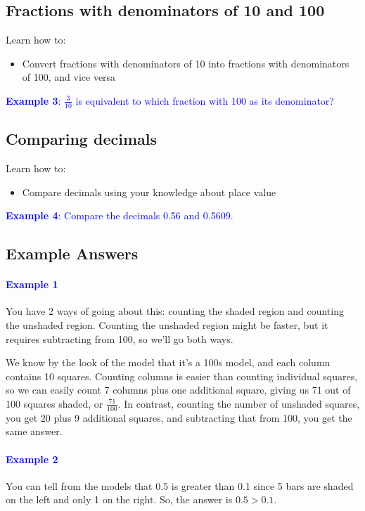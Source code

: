 \documentclass[a4paper, 12pt]{article}
\begin{document}
\subsection*{Fractions with denominators of 10 and 100}

Learn how to:

\begin{itemize}
    \item Convert fractions with denominators of 10 into fractions with denominators of 100, and vice versa
\end{itemize}

\textcolor{blue}{\textbf{Example 3}: $\frac{3}{10}$ is equivalent to which fraction with 100 as its denominator?}

\subsection*{Comparing decimals}
Learn how to:

\begin{itemize}
    \item Compare decimals using your knowledge about place value
\end{itemize}

\textcolor{blue}{\textbf{Example 4}: Compare the decimals 0.56 and 0.5609.}

\newpage

\subsection*{Example Answers}

\paragraph{\textcolor{blue}{Example 1}} You have 2 ways of going about this: counting the shaded region and counting the unshaded region. Counting the unshaded region might be faster, but it requires subtracting from 100, so we'll go both ways.

We know by the look of the model that it's a 100s model, and each column contains 10 squares. Counting columns is easier than counting individual squares, so we can easily count 7 columns plus one additional square, giving us 71 out of 100 squares shaded, or $\boxed{\frac{71}{100}}$. In contrast, counting the number of unshaded squares, you get 20 plus 9 additional squares, and subtracting that from 100, you get the same answer.

\paragraph{\textcolor{blue}{Example 2}} You can tell from the models that 0.5 is greater than 0.1 since 5 bars are shaded on the left and only 1 on the right. So, the answer is $\boxed{0.5>0.1}$.
\end{document}
